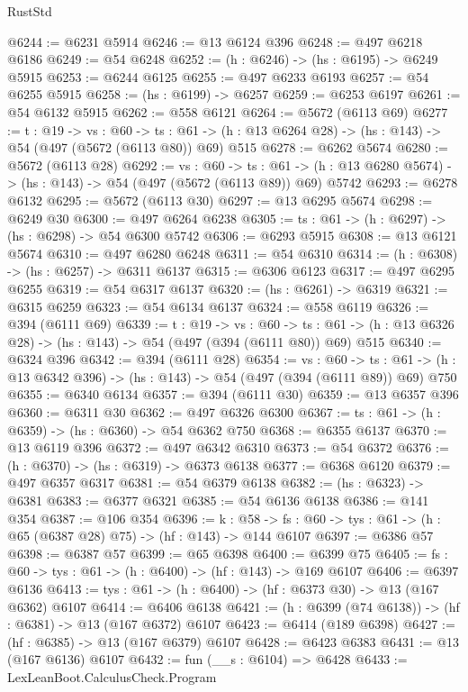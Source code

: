 \begin{lexlean}{RustStd}
\begin{coremodule}
{\begin{coremodule}
{{{{{{{{{{{{@6244 := @6231 @5914
@6246 := @13 @6124 @396
@6248 := @497 @6218 @6186
@6249 := @54 @6248
@6252 := (h : @6246) -> (hs : @6195) -> @6249 @5915
@6253 := @6244 @6125
@6255 := @497 @6233 @6193
@6257 := @54 @6255 @5915
@6258 := (hs : @6199) -> @6257
@6259 := @6253 @6197
@6261 := @54 @6132 @5915
@6262 := @558 @6121
@6264 := @5672 (@6113 @69)
@6277 := {t : @19} ->
  {vs : @60} ->
  {ts : @61} -> (h : @13 @6264 @28) -> (hs : @143) -> @54 (@497 (@5672 (@6113 @80)) @69) @515
@6278 := @6262 @5674
@6280 := @5672 (@6113 @28)
@6292 := {vs : @60} ->
  {ts : @61} -> (h : @13 @6280 @5674) -> (hs : @143) -> @54 (@497 (@5672 (@6113 @89)) @69) @5742
@6293 := @6278 @6132
@6295 := @5672 (@6113 @30)
@6297 := @13 @6295 @5674
@6298 := @6249 @30
@6300 := @497 @6264 @6238
@6305 := {ts : @61} -> (h : @6297) -> (hs : @6298) -> @54 @6300 @5742
@6306 := @6293 @5915
@6308 := @13 @6121 @5674
@6310 := @497 @6280 @6248
@6311 := @54 @6310
@6314 := (h : @6308) -> (hs : @6257) -> @6311 @6137
@6315 := @6306 @6123
@6317 := @497 @6295 @6255
@6319 := @54 @6317 @6137
@6320 := (hs : @6261) -> @6319
@6321 := @6315 @6259
@6323 := @54 @6134 @6137
@6324 := @558 @6119
@6326 := @394 (@6111 @69)
@6339 := {t : @19} ->
  {vs : @60} ->
  {ts : @61} -> (h : @13 @6326 @28) -> (hs : @143) -> @54 (@497 (@394 (@6111 @80)) @69) @515
@6340 := @6324 @396
@6342 := @394 (@6111 @28)
@6354 := {vs : @60} ->
  {ts : @61} -> (h : @13 @6342 @396) -> (hs : @143) -> @54 (@497 (@394 (@6111 @89)) @69) @750
@6355 := @6340 @6134
@6357 := @394 (@6111 @30)
@6359 := @13 @6357 @396
@6360 := @6311 @30
@6362 := @497 @6326 @6300
@6367 := {ts : @61} -> (h : @6359) -> (hs : @6360) -> @54 @6362 @750
@6368 := @6355 @6137
@6370 := @13 @6119 @396
@6372 := @497 @6342 @6310
@6373 := @54 @6372
@6376 := (h : @6370) -> (hs : @6319) -> @6373 @6138
@6377 := @6368 @6120
@6379 := @497 @6357 @6317
@6381 := @54 @6379 @6138
@6382 := (hs : @6323) -> @6381
@6383 := @6377 @6321
@6385 := @54 @6136 @6138
@6386 := @141 @354
@6387 := @106 @354
@6396 := {k : @58} ->
  {fs : @60} -> {tys : @61} -> (h : @65 (@6387 @28) @75) -> (hf : @143) -> @144 @6107
@6397 := @6386 @57
@6398 := @6387 @57
@6399 := @65 @6398
@6400 := @6399 @75
@6405 := {fs : @60} -> {tys : @61} -> (h : @6400) -> (hf : @143) -> @169 @6107
@6406 := @6397 @6136
@6413 := {tys : @61} -> (h : @6400) -> (hf : @6373 @30) -> @13 (@167 @6362) @6107
@6414 := @6406 @6138
@6421 := (h : @6399 (@74 @6138)) -> (hf : @6381) -> @13 (@167 @6372) @6107
@6423 := @6414 (@189 @6398)
@6427 := (hf : @6385) -> @13 (@167 @6379) @6107
@6428 := @6423 @6383
@6431 := @13 (@167 @6136) @6107
@6432 := fun (__s : @6104) => @6428
@6433 := LexLeanBoot.CalculusCheck.Program
}}}}}}}}}}}}
\end{coremodule}}
\end{coremodule}
\end{lexlean}
